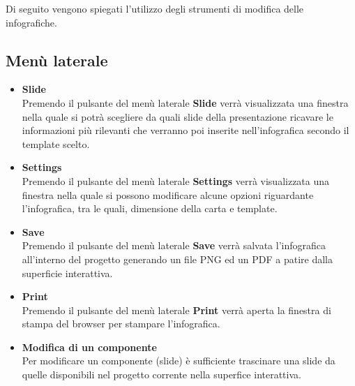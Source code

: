 \noindent
Di seguito vengono spiegati l'utilizzo degli strumenti di modifica delle infografiche.

\subsection{Menù laterale}
  \begin{itemize}
      \item \textbf{Slide}\\
	  Premendo il pulsante del menù laterale \textbf{Slide} verrà visualizzata una finestra nella quale si potrà scegliere da quali slide della presentazione ricavare le informazioni più rilevanti che verranno poi inserite nell'infografica secondo il template scelto.
      \item \textbf{Settings}\\
	  Premendo il pulsante del menù laterale \textbf{Settings} verrà visualizzata una finestra nella quale si possono modificare alcune opzioni riguardante l'infografica, tra le quali, dimensione della carta e template.
      \item \textbf{Save}\\
	  Premendo il pulsante del menù laterale \textbf{Save} verrà salvata l'infografica all'interno del progetto generando un file PNG ed un PDF a patire dalla superficie interattiva.
      \item \textbf{Print}\\
	  Premendo il pulsante del menù laterale \textbf{Print} verrà aperta la finestra di stampa del browser per stampare l'infografica.
      \item \textbf{Modifica di un componente}\\
	  Per modificare un componente (slide) è sufficiente trascinare una slide da quelle disponibili nel progetto corrente nella superfice interattiva.
  \end{itemize}